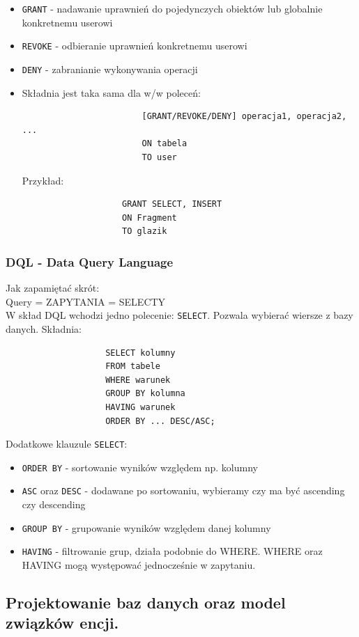 \documentclass[a4paper,12pt,oneside]{book}
\begin{document}
				\begin{itemize}
					\item \verb*|GRANT| - nadawanie uprawnień do pojedynczych obiektów lub globalnie konkretnemu userowi
					\item \verb*|REVOKE| - odbieranie uprawnień konkretnemu userowi
					\item \verb*|DENY| - zabranianie wykonywania operacji
					\item Składnia jest taka sama dla w/w poleceń:
					\begin{verbatim}
						[GRANT/REVOKE/DENY] operacja1, operacja2, ...
						ON tabela
						TO user
					\end{verbatim}
					Przykład:
					\begin{verbatim}
					GRANT SELECT, INSERT
					ON Fragment
					TO glazik
					\end{verbatim}
				\end{itemize}
				
				\subsubsection{DQL - Data Query Language}
				\noindent Jak zapamiętać skrót: \\ Query = ZAPYTANIA = SELECTY \\
				\noindent W skład DQL wchodzi jedno polecenie: \verb*|SELECT|. Pozwala wybierać wiersze z bazy danych. Składnia:
				\begin{verbatim}
					SELECT kolumny 
					FROM tabele 
					WHERE warunek
					GROUP BY kolumna
					HAVING warunek
					ORDER BY ... DESC/ASC;
				\end{verbatim}
				Dodatkowe klauzule \verb*|SELECT|:
				\begin{itemize}
					\itemsep 0em
					\item \verb*|ORDER BY| - sortowanie wyników względem np. kolumny
					\item \verb*|ASC| oraz \verb*|DESC| - dodawane po sortowaniu, wybieramy czy ma być ascending czy descending
					\item \verb*|GROUP BY| - grupowanie wyników względem danej kolumny
					\item \verb*|HAVING| - filtrowanie grup, działa podobnie do WHERE. WHERE oraz HAVING mogą występować jednocześnie w zapytaniu.
				\end{itemize}
				
			\newpage\subsection{Projektowanie baz danych oraz model związków encji.}
\end{document}
